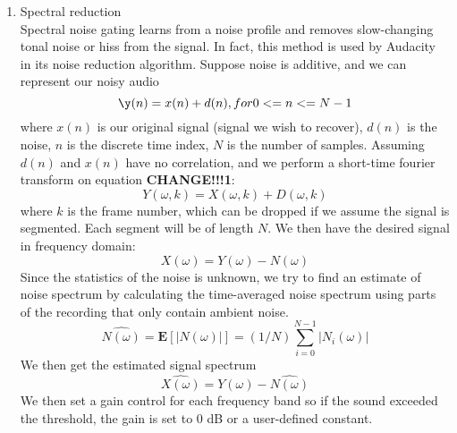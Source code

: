\begin{enumerate}
	\item Spectral reduction\\
	Spectral noise gating learns from a noise profile and removes slow-changing tonal noise or hiss from the signal. In 
	fact, this method is used by Audacity in its noise reduction algorithm. \cite{audacity}
	Suppose noise is additive, and we can represent our noisy audio 
	\begin{equation} \label{eq:1}
	\y(n) = x(n) + d(n), for 0 <= n <= N-1 
	\end{equation}
	where $x(n)$ is our original signal (signal we wish to recover), $d(n)$ is the noise, $n$ is the discrete time index,
	$N$ is the number of samples. 
	Assuming $d(n)$ and $x(n)$ have no correlation, and we perform a short-time fourier transform on equation \textbf{CHANGE!!!1}:
	\[Y(\omega,k)= X(\omega,k) + D(\omega,k)\]
	where $k$ is the frame number, which can be dropped if we assume the signal is segmented. Each segment will be of
	length $N$. We then have the desired signal in frequency domain:
	\[X(\omega) = Y(\omega) - N(\omega)\]
	Since the statistics of the noise is unknown, we try to find an estimate of noise spectrum by calculating the time-averaged
	noise spectrum using parts of the recording that only contain ambient noise. \cite{reductionmanual}
	\[\hat{N(\omega)} = \textbf{E}[|N(\omega)|] = (1/N)\sum_{i=0}^{N-1}|N_i(\omega)|\]
	We then get the estimated signal spectrum
	\[\hat{X(\omega)} = Y(\omega) - \hat{N(\omega)}\]
	We then set a gain control for each frequency band so if the sound exceeded the threshold, the gain is set to 0 dB or a user-defined
	constant.
\end{enumerate}
